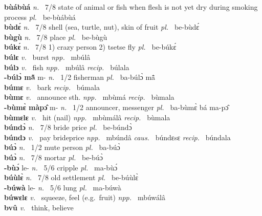 {\bfseries bùábùá}  {\itshape n.~} 7/8 state of animal or fish when flesh is not yet dry during smoking process {\itshape pl.~}  be-bùábùá \\ 
{\bfseries bùdɛ́}  {\itshape n.~} 7/8 shell (sea, turtle, nut), skin of fruit {\itshape pl.~} be-bùdɛ́    \\ 
{\bfseries bùgù}  {\itshape n.~} 7/8 place {\itshape pl.~} be-bùgù    \\ 
{\bfseries búkɛ́}  {\itshape n.~} 7/8 1) crazy person 2) tsetse fly {\itshape pl.~} be-búkɛ́    \\ 
{\bfseries búlɛ}  {\itshape v.~} burst   {\itshape npp.~} mbúlâ  \\ 
{\bfseries búlɔ}  {\itshape v.~} fish   {\itshape npp.~} mbúlâ {\itshape recip.~} búlala  \\ 
{\bfseries -búlɔ̀ mã̂} m- {\itshape n.~} 1/2 fisherman {\itshape pl.~} ba-búlɔ̀ mã̂    \\ 
{\bfseries búmɛ}  {\itshape v.~} bark   {\itshape recip.~} búmala  \\ 
{\bfseries bùmɛ}  {\itshape v.~} announce sth.   {\itshape npp.~} mbùmá {\itshape recip.~} bùmala  \\ 
{\bfseries -bùmɛ̀ màpɔ̂} m- {\itshape n.~} 1/2 announcer, messenger {\itshape pl.~} ba-bùmɛ̀ bá ma-pɔ̂    \\ 
{\bfseries bùmɛlɛ}  {\itshape v.~} hit (nail)   {\itshape npp.~} mbùmálâ {\itshape recip.~} bùmala  \\ 
{\bfseries búndɔ̀}  {\itshape n.~} 7/8 bride price {\itshape pl.~} be-búndɔ̀    \\ 
{\bfseries búndɔ}  {\itshape v.~} pay brideprice   {\itshape npp.~} mbúndâ {\itshape caus.~} búndɛsɛ {\itshape recip.~} búndala  \\ 
{\bfseries búɔ̀}  {\itshape n.~} 1/2 mute person {\itshape pl.~} ba-búɔ̀    \\ 
{\bfseries búɔ̀}  {\itshape n.~} 7/8 mortar {\itshape pl.~} be-búɔ̀    \\ 
{\bfseries -bùɔ́} le- {\itshape n.~} 5/6 cripple {\itshape pl.~} ma-bùɔ́    \\ 
{\bfseries búùlɛ̀}  {\itshape n.~} 7/8 old settlement {\itshape pl.~} be-búùlɛ̀    \\ 
{\bfseries -búwà} le- {\itshape n.~} 5/6 lung {\itshape pl.~} ma-búwà    \\ 
{\bfseries búwɛlɛ}  {\itshape v.~} squeeze, feel (e.g.\ fruit)   {\itshape npp.~} mbúwálâ  \\ 
{\bfseries bvû}  {\itshape v.~} think, believe  \\ 
